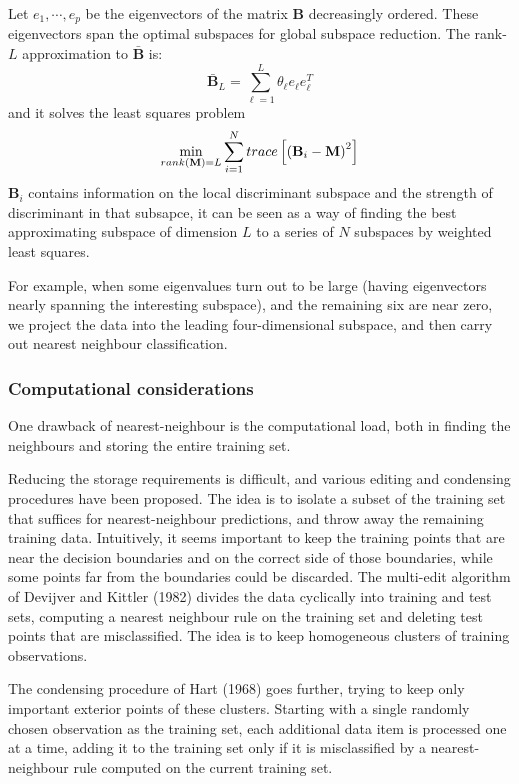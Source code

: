 Let $e_1, \cdots, e_p$ be the eigenvectors  of the matrix $\mathbf{B}$ decreasingly ordered. These eigenvectors span the optimal subspaces for global subspace reduction. The rank-$L$ approximation to $\bar{\mathbf{B}}$ is:
\begin{equation}
\bar{\mathbf{B}}_L = \sum_{\ell=1}^L \theta_\ell e_\ell e_\ell^T
\end{equation}
and it solves the least squares problem
\begin{equation}
\min_{rank(\mathbf{M}) = L} \sum_{i=1}^N trace \left[ \left(\mathbf{B}_i - \mathbf{M}\right)^2\right]
\end{equation}
$\mathbf{B}_i$ contains information on the local discriminant subspace and the strength of discriminant in that subsapce, it can be seen as a way of finding the best approximating subspace of dimension $L$ to a series of $N$ subspaces by weighted least squares.

For example, when some eigenvalues turn out to be large (having eigenvectors nearly spanning the interesting subspace), and the remaining six are near zero,  we project the data into the leading four-dimensional subspace, and then carry out nearest neighbour classification.

\subsubsection{Computational considerations}
One drawback of nearest-neighbour is the computational load, both in finding the neighbours and storing the entire training set.

Reducing the storage requirements is difficult, and various editing and condensing procedures have been proposed. The idea is to isolate a subset of the training set that suffices for nearest-neighbour predictions, and throw away the remaining training data. Intuitively, it seems important to keep the training points that are near the decision boundaries and on the correct side of those boundaries, while some points far from the boundaries could be discarded.
The multi-edit algorithm of Devijver and Kittler (1982) divides the data cyclically into training and test sets, computing a nearest neighbour rule on the training set and deleting test points that are misclassified. The idea is to keep homogeneous clusters of training observations.

The condensing procedure of Hart (1968) goes further, trying to keep only important exterior points of these clusters. Starting with a single randomly chosen observation as the training set, each additional data item is processed one at a time, adding it to the training set only if it is misclassified by a nearest-neighbour rule computed on the current training set.
